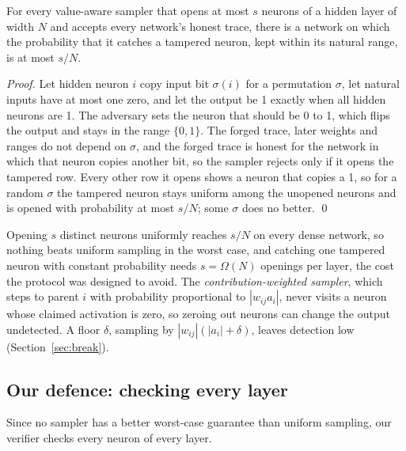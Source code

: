 \documentclass[sigconf,nonacm]{acmart}
\begin{document}
\begin{proposition}
\label{prop:anysampler}
For every value-aware sampler that opens at most $s$ neurons of a hidden layer of width $N$ and
accepts every network's honest trace, there is a network on which the probability that it catches a
tampered neuron, kept within its natural range, is at most $s/N$.
\end{proposition}

\noindent\emph{Proof.} Let hidden neuron $i$ copy input bit $\sigma(i)$ for a permutation $\sigma$,
let natural inputs have at most one zero, and let the output be 1 exactly when all hidden neurons
are 1. The adversary sets the neuron that should be 0 to 1, which flips the output and
stays in the range $\{0,1\}$. The forged trace, later weights and ranges do not depend on $\sigma$,
and the forged trace is honest for the network in which that neuron copies another bit, so the
sampler rejects only if it opens the tampered row. Every other row it opens shows a neuron that
copies a 1, so for a random $\sigma$ the tampered neuron stays uniform among the unopened neurons and
is opened with probability at most $s/N$; some $\sigma$ does no better. \qed

\noindent Opening $s$ distinct neurons uniformly reaches $s/N$ on every dense network, so nothing
beats uniform sampling in the worst case, and catching one tampered neuron with constant
probability needs $s=\Omega(N)$ openings per layer, the cost the protocol was designed to avoid.
The \emph{contribution-weighted sampler}, which steps to parent $i$ with probability proportional
to $|w_{ij} a_i|$, never visits a neuron whose claimed activation is zero, so zeroing out neurons
can change the output undetected. A floor $\delta$, sampling by $|w_{ij}|(|a_i|+\delta)$, leaves
detection low (Section~\ref{sec:break}).

\subsection{Our defence: checking every layer}
\label{sec:defence}

Since no sampler has a better worst-case guarantee than uniform sampling, our verifier checks every
neuron of every layer.
\end{document}
